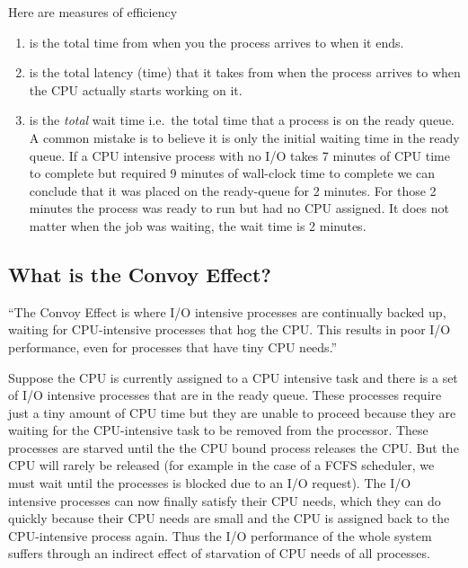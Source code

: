 Here are measures of efficiency

\begin{enumerate}
  \item {} is the total time from when you the process arrives to when it ends. 
  \item {} is the total latency (time) that it takes from when the process arrives to when the CPU actually starts working on it. 
  \item {} is the \emph{total} wait time i.e.~the total time that a process is on the ready queue. A common mistake is to believe it is only the initial waiting time in the ready queue. If a CPU intensive process with no I/O takes 7 minutes of CPU time to complete but required 9 minutes of wall-clock time to complete we can conclude that it was placed on the ready-queue for 2 minutes. For those 2 minutes the process was ready to run but had no CPU assigned. It does not matter when the job was waiting, the wait time is 2 minutes. 

\end{enumerate} 

\subsection{What is the Convoy Effect?}

``The Convoy Effect is where I/O intensive processes are continually backed up, waiting for CPU-intensive processes that hog the CPU. This results in poor I/O performance, even for processes that have tiny CPU needs.''

Suppose the CPU is currently assigned to a CPU intensive task and there is a set of I/O intensive processes that are in the ready queue. These processes require just a tiny amount of CPU time but they are unable to proceed because they are waiting for the CPU-intensive task to be removed from the processor. These processes are starved until the the CPU bound process releases the CPU. But the CPU will rarely be released (for example in the case of a FCFS scheduler, we must wait until the processes is blocked due to an I/O request). The I/O intensive processes can now finally satisfy their CPU needs, which they can do quickly because their CPU needs are small and the CPU is assigned back to the CPU-intensive process again. Thus the I/O performance of the whole system suffers through an indirect effect of starvation of CPU needs of all processes.

